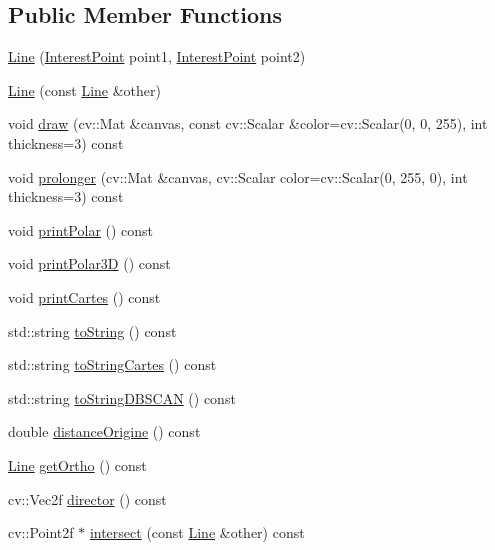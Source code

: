 \subsection*{Public Member Functions}
\begin{DoxyCompactItemize}
\item 
\hyperlink{classdefals_1_1_line_abede8f2808bda8a485e99e40c8ff3d38}{Line} (\hyperlink{classdefals_1_1_interest_point}{Interest\+Point} point1, \hyperlink{classdefals_1_1_interest_point}{Interest\+Point} point2)
\item 
\hyperlink{classdefals_1_1_line_ac40968264c0af3b70506c13ce3b70b5b}{Line} (const \hyperlink{classdefals_1_1_line}{Line} \&other)
\item 
void \hyperlink{classdefals_1_1_line_aff1b80e77814f9136512023fdfedaf85}{draw} (cv\+::\+Mat \&canvas, const cv\+::\+Scalar \&color=cv\+::\+Scalar(0, 0, 255), int thickness=3) const
\item 
void \hyperlink{classdefals_1_1_line_a5807943405bdaadfea9b35eeb63fdd46}{prolonger} (cv\+::\+Mat \&canvas, cv\+::\+Scalar color=cv\+::\+Scalar(0, 255, 0), int thickness=3) const
\item 
void \hyperlink{classdefals_1_1_line_af77fba109ba0f85eca871478f2a9fe28}{print\+Polar} () const
\item 
void \hyperlink{classdefals_1_1_line_a0ca052b53e5b2c21003ff7422fa23064}{print\+Polar3D} () const
\item 
void \hyperlink{classdefals_1_1_line_a56673f0353400060779c6f3b994f110e}{print\+Cartes} () const
\item 
std\+::string \hyperlink{classdefals_1_1_line_a8bed9f8c95fec470526b5d91a9681ee4}{to\+String} () const
\item 
std\+::string \hyperlink{classdefals_1_1_line_a1ff7ede93d7ac87e25ea55879de1665b}{to\+String\+Cartes} () const
\item 
std\+::string \hyperlink{classdefals_1_1_line_a4dabf6b34922c349b645a36a499f9cf9}{to\+String\+D\+B\+S\+C\+AN} () const
\item 
double \hyperlink{classdefals_1_1_line_a0fec2160803d603b3f341814ccf67499}{distance\+Origine} () const
\item 
\hyperlink{classdefals_1_1_line}{Line} \hyperlink{classdefals_1_1_line_a492062a13ab9927c7b933a1cbdfffc37}{get\+Ortho} () const
\item 
cv\+::\+Vec2f \hyperlink{classdefals_1_1_line_a1ef3a690801f085b7f7eb20b7d09ef8f}{director} () const
\item 
cv\+::\+Point2f $\ast$ \hyperlink{classdefals_1_1_line_aed7eb799e6b17c5938acafe14c94fb70}{intersect} (const \hyperlink{classdefals_1_1_line}{Line} \&other) const

\end{DoxyCompactItemize}
